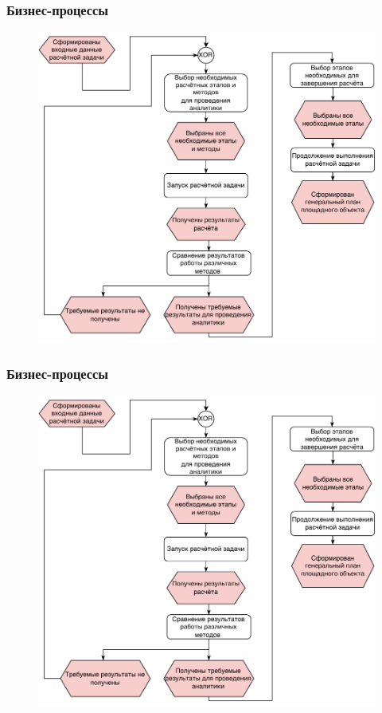 \begin{frame}
\frametitle{Бизнес-процессы}
\begin{figure}
    \includegraphics[scale=.49]{pictures/analytics_epc}
\end{figure}
\end{frame}


\begin{frame}
\frametitle{Бизнес-процессы}
\begin{figure}
    \includegraphics[scale=.49]{pictures/analytics_epc}
\end{figure}
\end{frame}


